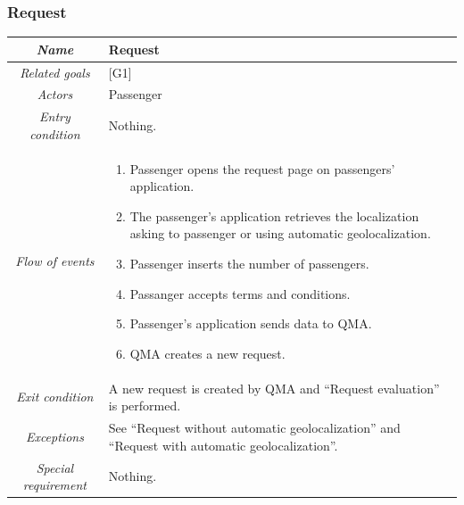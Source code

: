 \subsubsection{Request}

\begin{flushleft}
\begin{tabular}{c|>{\centering}p{10cm}}
\hline 
\emph{Name} & \raggedright{}Request\tabularnewline
\hline 
\emph{Related goals} & \raggedright{}{[}G1{]}\tabularnewline
\hline 
\emph{Actors} & \raggedright{}Passenger\tabularnewline
\hline 
\emph{Entry condition} & \raggedright{}Nothing.\tabularnewline
\hline 
\emph{Flow of events} & \begin{enumerate}
\item \begin{raggedright}
Passenger opens the request page on passengers' application.
\par\end{raggedright}
\item \begin{raggedright}
The passenger's application retrieves the localization asking to passenger
or using automatic geolocalization.
\par\end{raggedright}
\item \begin{raggedright}
Passenger inserts the number of passengers.
\par\end{raggedright}
\item \begin{raggedright}
Passanger accepts terms and conditions.
\par\end{raggedright}
\item \begin{raggedright}
Passenger's application sends data to QMA.
\par\end{raggedright}
\item \raggedright{}QMA creates a new request.\end{enumerate}
\tabularnewline
\hline 
\emph{Exit condition} & \raggedright{}A new request is created by QMA and ``Request evaluation''
is performed.\tabularnewline
\hline 
\emph{Exceptions} & \raggedright{}See ``Request without automatic geolocalization''
and ``Request with automatic geolocalization''.\tabularnewline
\hline 
\emph{Special requirement} & \raggedright{}Nothing.\tabularnewline
\hline 
\end{tabular}
\par\end{flushleft}


